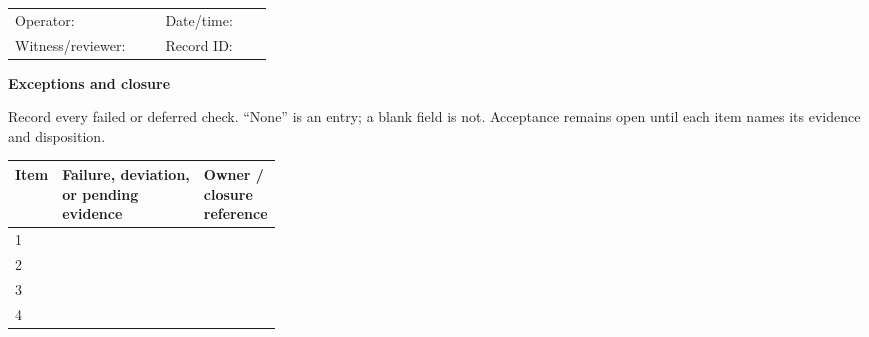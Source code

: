\medskip
\begin{tabularx}{\linewidth}{@{}p{0.18\linewidth}Xp{0.12\linewidth}X@{}}
Operator: & \hrulefill & Date/time: & \hrulefill\\[1.4em]
Witness/reviewer: & \hrulefill & Record ID: & \hrulefill
\end{tabularx}

\medskip
\noindent\textbf{Exceptions and closure}\par\smallskip
Record every failed or deferred check. ``None'' is an entry; a blank field is
not. Acceptance remains open until each item names its evidence and disposition.

\begin{tabularx}{\linewidth}{@{}p{0.08\linewidth}Xp{0.23\linewidth}@{}}
\toprule
\textbf{Item} & \textbf{Failure, deviation, or pending evidence} &
\textbf{Owner / closure reference}\\
\midrule
1 & &\\[1.8em]
2 & &\\[1.8em]
3 & &\\[1.8em]
4 & &\\
\bottomrule
\end{tabularx}

